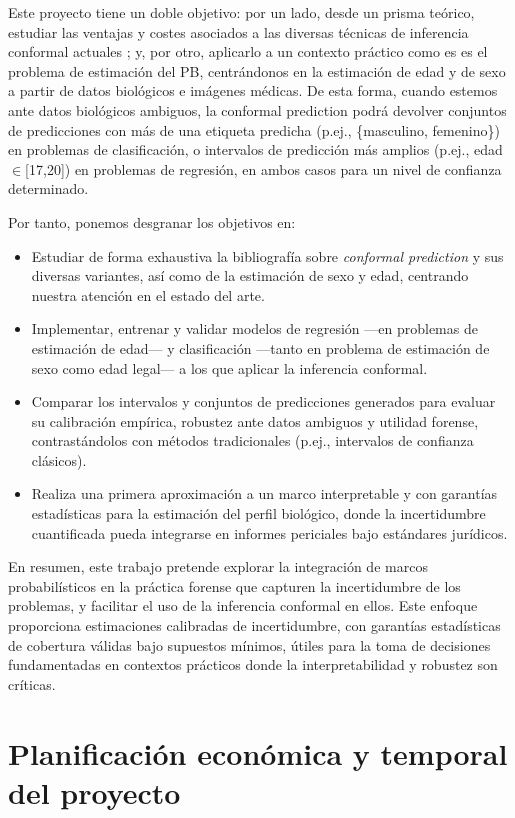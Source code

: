
Este proyecto tiene un doble objetivo: por un lado, desde un prisma teórico, estudiar las ventajas y costes 
asociados a las diversas técnicas de inferencia conformal actuales
; y, por otro, aplicarlo a un contexto práctico como es es el problema de estimación del PB, 
centrándonos en la estimación de edad y de sexo a partir de datos biológicos e imágenes médicas. De esta 
forma, cuando estemos ante datos biológicos ambiguos, la conformal prediction podrá devolver conjuntos de 
predicciones con más de una etiqueta predicha (p.ej., \{masculino, femenino\}) en problemas de clasificación, 
o intervalos de predicción más amplios (p.ej., edad$\in$[17,20]) en problemas de regresión, en ambos casos 
para un nivel de confianza determinado.

Por tanto, ponemos desgranar los objetivos en:

\begin{itemize}

    \item Estudiar de forma exhaustiva la bibliografía sobre \textit{conformal prediction} y sus diversas 
    variantes, así como de la estimación de sexo y edad, centrando nuestra atención en el estado del arte.

    \item Implementar, entrenar y validar modelos de regresión ---en problemas de estimación de edad--- y 
    clasificación ---tanto en problema de estimación de sexo como edad legal--- a los que aplicar la 
    inferencia conformal.

    \item Comparar los intervalos y conjuntos de predicciones generados para evaluar su calibración empírica, 
    robustez ante datos ambiguos y utilidad forense, contrastándolos con métodos tradicionales (p.ej., 
    intervalos de confianza clásicos).  

    \item Realiza una primera aproximación a un marco interpretable y con garantías estadísticas para la 
    estimación del perfil biológico, donde la incertidumbre cuantificada pueda integrarse en informes 
    periciales bajo estándares jurídicos.

\end{itemize}

En resumen, este trabajo pretende explorar la integración de marcos probabilísticos en la práctica forense
que capturen la incertidumbre de los problemas, y facilitar el uso de la inferencia conformal en ellos. 
Este enfoque proporciona estimaciones calibradas de incertidumbre, con garantías estadísticas de cobertura 
válidas bajo supuestos mínimos, útiles para la toma de decisiones fundamentadas en contextos prácticos 
donde la interpretabilidad y robustez son críticas.


\section{Planificación económica y temporal del proyecto}




